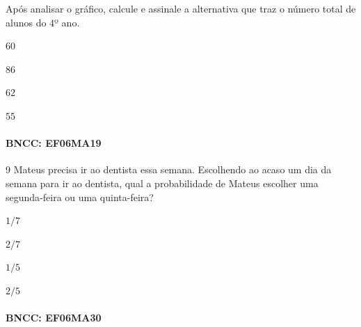 Após analisar o gráfico, calcule e assinale a alternativa que traz o
número total de alunos do $4$º ano.

\begin{escolha}
\item $60$
\item $86$
\item $62$
\item $55$
\end{escolha}

\paragraph{BNCC: EF06MA19 }


\num{9}  Mateus precisa ir ao dentista essa semana. Escolhendo ao acaso um dia
da semana para ir ao dentista, qual a probabilidade de Mateus escolher
uma segunda-feira ou uma quinta-feira?

\begin{escolha}
\item
  $1/7$
\item
  $2/7$
\item
  $1/5$
\item
  $2/5$
\end{escolha}


\paragraph{BNCC: EF06MA30 }

